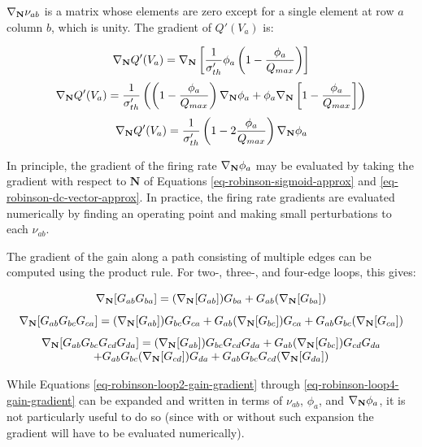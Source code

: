 $\nabla_{\mathbf{N}} \nu_{ab}$ is a matrix whose elements are zero except for a single
element at row $a$ column $b$, which is unity. The gradient of $Q'(V_a)$ is:

\begin{equation}
\nabla_{\mathbf{N}} Q'(V_a) = \nabla_{\mathbf{N}} \left [
\frac{1}{\sigma'_{th}} \phi_a \left ( 1 - \frac{\phi_a}{Q_{max}} \right )
\right ]
\end{equation}
%
\begin{equation}
\nabla_{\mathbf{N}} Q'(V_a) =
\frac{1}{\sigma'_{th}} \left (
\left ( 1 - \frac{\phi_a}{Q_{max}} \right ) \nabla_{\mathbf{N}} \phi_a
+ \phi_a \nabla_{\mathbf{N}} \left [ 1 - \frac{\phi_a}{Q_{max}} \right ]
\right )
\end{equation}
%
\begin{equation}
\nabla_{\mathbf{N}} Q'(V_a) = \frac{1}{\sigma'_{th}}
\left ( 1 - 2 \frac{\phi_a}{Q_{max}} \right ) \nabla_{\mathbf{N}} \phi_a
\label{eq-robinson-qprime-gradient}
\end{equation}

In principle, the gradient of the firing rate $\nabla_{\mathbf{N}} \phi_a$ may be
evaluated by taking the gradient with respect to $\mathbf{N}$ of Equations
\ref{eq-robinson-sigmoid-approx} and \ref{eq-robinson-dc-vector-approx}. In
practice, the firing rate gradients are evaluated numerically by finding an
operating point and making small perturbations to each $\nu_{ab}$.

The gradient of the gain along a path consisting of multiple edges can be
computed using the product rule. For two-, three-, and four-edge loops,
this gives:

\begin{equation}
\nabla_{\mathbf{N}} [ G_{ab} G_{ba} ] =
( \nabla_{\mathbf{N}} [ G_{ab} ] ) G_{ba} + G_{ab} ( \nabla_{\mathbf{N}} [ G_{ba} ] )
\label{eq-robinson-loop2-gain-gradient}
\end{equation}
%
\begin{equation}
\nabla_{\mathbf{N}} [ G_{ab} G_{bc} G_{ca} ] =
( \nabla_{\mathbf{N}} [ G_{ab} ] ) G_{bc} G_{ca} + G_{ab} ( \nabla_{\mathbf{N}} [ G_{bc} ] ) G_{ca}
+ G_{ab} G_{bc} ( \nabla_{\mathbf{N}} [ G_{ca} ] )
\label{eq-robinson-loop3-gain-gradient}
\end{equation}
%
\begin{equation}
\begin{array}{c}
\nabla_{\mathbf{N}} [ G_{ab} G_{bc} G_{cd} G_{da} ] =
( \nabla_{\mathbf{N}} [ G_{ab} ] ) G_{bc} G_{cd} G_{da}
+ G_{ab} ( \nabla_{\mathbf{N}} [ G_{bc} ] ) G_{cd} G_{da}
\\
+ G_{ab} G_{bc} ( \nabla_{\mathbf{N}} [ G_{cd} ] ) G_{da}
+ G_{ab} G_{bc} G_{cd} ( \nabla_{\mathbf{N}} [ G_{da} ] )
\end{array}
\label{eq-robinson-loop4-gain-gradient}
\end{equation}

While Equations \ref{eq-robinson-loop2-gain-gradient} through
\ref{eq-robinson-loop4-gain-gradient} can be expanded and written in terms
of $\nu_{ab}$, $\phi_{a}$, and $\nabla_{\mathbf{N}} \phi_{a}$, it is not particularly
useful to do so (since with or without such expansion the gradient will
have to be evaluated numerically).



%
%
